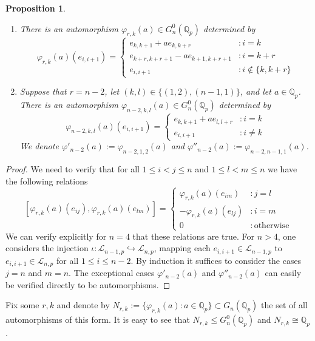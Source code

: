 \documentclass[12pt]{article}
\newtheorem{proposition}[theorem]{Proposition}
\begin{document}
\begin{proposition}
\label{phi.r.k}
\begin{enumerate}
Let $2\leq{r}\leq{n-2}$, and let $0\leq{k}\leq{n-r}$, and let $a\in\mathbb{Q}_{p}$. 
\item There is an automorphism $\varphi_{r,k}(a)\in{G_{n}^{0}(\mathbb{Q}_{p})}$ determined by \[
    \varphi_{r,k}(a)(e_{i,i+1})=\begin{cases}
        e_{k,k+1}+a{e_{k,k+r}} & : i=k\\
        e_{k+r,k+r+1}-a{e_{k+1,k+r+1}} & : i=k+r\\
        e_{i,i+1} & : i\notin\{k,k+r\}
    \end{cases}
\]
\item Suppose that $r=n-2$, let $(k,l)\in\{(1,2),(n-1,1)\}$, and let $a\in\mathbb{Q}_{p}$. There is an automorphism $\varphi_{n-2,k,l}(a)\in{G_{n}^{0}(\mathbb{Q}_{p})}$ determined by \[
    \varphi_{n-2,k,l}(a)(e_{i,i+1})=\begin{cases}
        e_{k,k+1}+a{e_{l,l+r}} & : i=k\\
        e_{i,i+1} & : i\neq{k}
    \end{cases}
\]
    We denote $\varphi'_{n-2}(a):=\varphi_{n-2,1,2}(a)$ and $\varphi''_{n-2}(a):=\varphi_{n-2,n-1,1}(a)$.
\end{enumerate}
\end{proposition}
\begin{proof}
We need to verify that for all $1\leq{i<j}\leq{n}$ and $1\leq{l<m}\leq{n}$ we have the following relations \[
    [\varphi_{r,k}(a)(e_{ij}),\varphi_{r,k}(a)(e_{lm})]=\begin{cases}
    \varphi_{r,k}(a)(e_{im}) & : j=l\\
        -\varphi_{r,k}(a)(e_{lj}) & : i=m\\
        0 & : \mathrm{otherwise}
    \end{cases}
\]
We can verify explicitly for $n=4$ that these relations are true. For $n>4$, one considers the injection $\iota:\mathcal{L}_{n-1,p}\hookrightarrow\mathcal{L}_{n,p}$, mapping each $e_{i,i+1}\in\mathcal{L}_{n-1,p}$ to $e_{i,i+1}\in\mathcal{L}_{n,p}$ for all $1\leq{i}\leq{n-2}$. By induction it suffices to consider the cases $j=n$ and $m=n$. The exceptional cases $\varphi'_{n-2}(a)$ and $\varphi''_{n-2}(a)$ can easily be verified directly to be automorphisms.
\end{proof}
Fix some $r,k$ and denote by $N_{r,k}:=\{\varphi_{r,k}(a) : a\in\mathbb{Q}_{p}\}\subset{G_{n}(\mathbb{Q}_{p})}$ the set of all automorphisms of this form. It is easy to see that $N_{r,k}\leq{G_{n}^{0}(\mathbb{Q}_{p})}$ and $N_{r,k}\cong\mathbb{Q}_{p}$.
\end{document}

